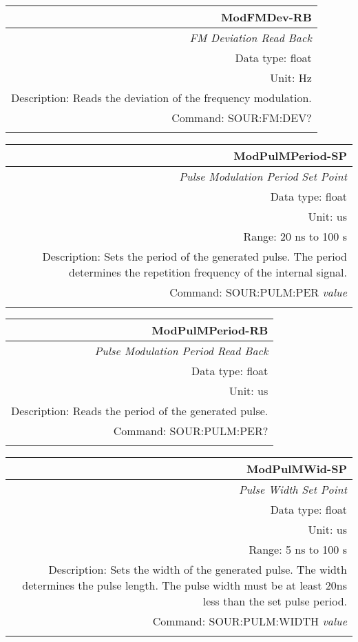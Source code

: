 \documentclass[openany]{article}
\begin{document}
		\begin{tabular}{N}
			\hline
			\bfseries ModFMDev-RB \\ \hline
			\emph{FM Deviation Read Back} \\
			Data type: float \\
			Unit: Hz \\
			Description: Reads the deviation of the frequency modulation. \\
			Command: SOUR:FM:DEV? \\
			\\

		\end{tabular}


		\begin{tabular}{N}
			\hline
			\bfseries ModPulMPeriod-SP \\ \hline
			\emph{Pulse Modulation Period Set Point} \\
			Data type: float \\
			Unit: us \\ 
			Range: 20 ns to 100 s \\
			Description: Sets the period of the generated pulse. The period determines the repetition frequency of the internal signal. \\
			Command: SOUR:PULM:PER \emph{value} \\
			\\
			
		\end{tabular}


		\begin{tabular}{N}
			\hline
			\bfseries ModPulMPeriod-RB \\ \hline
			\emph{Pulse Modulation Period Read Back} \\
			Data type: float \\
			Unit: us \\
			Description: Reads the period of the generated pulse. \\
			Command: SOUR:PULM:PER? \\
			\\

		\end{tabular}


		\begin{tabular}{N}
			\hline
			\bfseries ModPulMWid-SP \\ \hline
			\emph{Pulse Width Set Point} \\
			Data type: float \\
			Unit: us \\ 
			Range: 5 ns to 100 s \\
			Description: Sets the width of the generated pulse. The width determines the pulse length. The pulse width must be at least 20ns less than the set pulse period. \\
			Command: SOUR:PULM:WIDTH \emph{value} \\
			\\
			
		\end{tabular}
\end{document}
